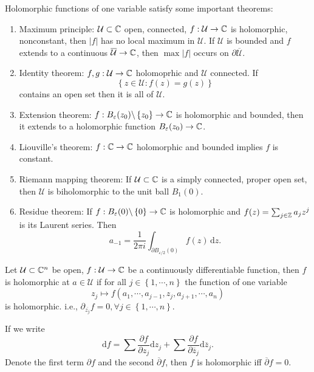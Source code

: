 Holomorphic functions of one variable satisfy some important theorems:
\begin{enumerate}
  \item Maximum principle: $\mathcal{U}\subset \mathbb{C}$ open, connected, $f:\mathcal{U}\to \mathbb{C}$ is holomorphic, nonconstant, then $|f|$ has no local maximum in $\mathcal{U}$. If $\mathcal{U}$ is bounded and $f$ extends to a continuous $\overline{\mathcal{U}}\to \mathbb{C}$, then $\max |f|$ occurs on $\partial \overline{\mathcal{U}}$.
  \item Identity theorem: $f,g:\mathcal{U}\to \mathbb{C}$ holomoprhic and $\mathcal{U}$ connected. If $$\left\{z\in \mathcal{U}:f(z)=g(z)\right\} $$ contains an open set then it is all of $\mathcal{U}$.
  \item Extension theorem: $f:B_\varepsilon (z_0) \backslash  \left\{z_0\right\} \to \mathbb{C}$ is holomorphic and bounded, then it extends to a holomorphic function $B_{\varepsilon }(z_0)\to \mathbb{C}$.
  \item Liouville's theorem: $f:\mathbb{C}\to \mathbb{C}$ holomorphic and bounded implies $f$ is constant.
  \item Riemann mapping theorem: If $\mathcal{U}\subset \mathbb{C}$ is a simply connected, proper open set, then $\mathcal{U}$ is biholomorphic to the unit ball $B_1(0)$.
  \item Residue theorem: If $f:B_\varepsilon (0) \backslash  \left\{0\right\} \to \mathbb{C}$ is holomorphic and $f(z)=\sum_{j\in \mathbb{Z}}^{} a_jz^{j}$ is its Laurent series. Then
    \[
      a_{-1}=\frac{1}{2\pi i}\int_{\partial B_{\varepsilon  /2}(0)}f(z)\,\mathrm{d}z.
    \] 
\end{enumerate}


\begin{definition}
  Let $\mathcal{U}\subset \mathbb{C}^{n}$ be open, $f:\mathcal{U}\to \mathbb{C}$ be a continuously differentiable function,  then $f$ is holomorphic at $a\in \mathcal{U}$ if for all $j\in \left\{1,\cdots ,n\right\} $ the function of one variable 
  \[
    z_j\mapsto f(a_1,\cdots ,a_{j-1}, z_j, a_{j+1},\cdots ,a_n)
  \] is holomorphic. i.e., $\partial_{\overline{z_j}}f=0,\forall j \in \left\{1,\cdots ,n\right\} $.
\end{definition}
If we write 
\[
\mathrm{d}f=\sum \frac{\partial f}{\partial z_j} \mathrm{d}z_j+\sum \frac{\partial f}{\partial \overline{z}_j} \mathrm{d}\overline{z}_j.
\] 
Denote the first term $\partial f$ and the second $\overline{\partial}f$, then $f$ is holomorphic iff $\overline{\partial}f=0$.

